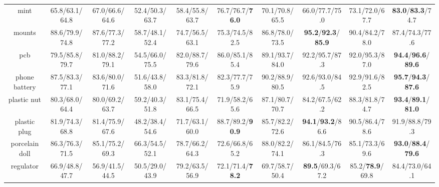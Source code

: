 \documentclass{article}
\theoremstyle{plain}
\theoremstyle{definition}
\theoremstyle{remark}
\begin{document}
\begin{table}[p]
{\begin{tabular}{ccccccccc>{\columncolor{oursblue}}c}
mint             & 65.8/63.1/64.8 & 67.0/66.6/64.6 & 52.4/50.3/63.7 & 58.4/55.8/63.7 & 76.7/76.7/\textbf{76.0} & 70.1/70.8/65.5 & 66.0/77.7/75.0 & 73.1/72.0/67.7 & \textbf{83.0}/\textbf{83.3}/74.7 \\
\cellcolor{rowgray} mounts & \cellcolor{rowgray} 88.6/79.9/74.8 & \cellcolor{rowgray} 87.6/77.3/77.2 & \cellcolor{rowgray} 58.7/48.1/52.4 & \cellcolor{rowgray} 74.7/56.5/63.1 & \cellcolor{rowgray} 75.3/74.5/82.5 & \cellcolor{rowgray} 86.8/78.0/73.5 & \cellcolor{rowgray} \textbf{95.2}/\textbf{92.3}/\textbf{85.9} & \cellcolor{rowgray} 90.4/84.2/78.0 & 87.4/74.3/77.6 \\
pcb              & 79.5/85.8/79.7 & 81.0/88.2/79.1 & 54.5/66.0/75.5 & 82.0/88.7/79.6 & 86.0/85.1/85.4 & 89.1/93.7/84.0 & 92.2/95.7/87.3 & 92.0/95.3/87.0 & \textbf{94.4}/\textbf{96.6}/\textbf{89.6} \\
\cellcolor{rowgray} phone battery & \cellcolor{rowgray} 87.5/83.3/77.1 & \cellcolor{rowgray} 83.6/80.0/71.6 & \cellcolor{rowgray} 51.6/43.8/58.0 & \cellcolor{rowgray} 83.3/81.8/72.1 & \cellcolor{rowgray} 82.3/77.7/75.9 & \cellcolor{rowgray} 90.2/88.9/80.5 & \cellcolor{rowgray} 92.6/93.0/84.5 & \cellcolor{rowgray} 92.9/91.6/82.5 & \textbf{95.7}/\textbf{94.3}/\textbf{87.6} \\
plastic nut      & 80.3/68.0/64.4 & 80.0/69.2/63.7 & 59.2/40.3/51.8 & 83.1/75.4/66.5 & 71.9/58.2/65.6 & 87.1/80.7/70.7 & 84.2/67.5/62.2 & 88.3/81.8/74.7 & \textbf{93.4}/\textbf{89.1}/\textbf{81.0} \\
\cellcolor{rowgray} plastic plug & \cellcolor{rowgray} 81.9/74.3/68.8 & \cellcolor{rowgray} 81.4/75.9/67.6 & \cellcolor{rowgray} 48.2/38.4/54.6 & \cellcolor{rowgray} 71.7/63.1/60.0 & \cellcolor{rowgray} 88.7/89.2/\textbf{90.9} & \cellcolor{rowgray} 85.7/82.2/72.6 & \cellcolor{rowgray} \textbf{94.1}/\textbf{93.2}/86.6 & \cellcolor{rowgray} 90.5/86.4/78.6 & 91.9/88.8/79.3 \\
porcelain doll   & 86.3/76.3/71.5 & 85.1/75.2/69.3 & 66.3/54.5/52.1 & 78.7/66.2/64.3 & 72.6/66.8/65.2 & 88.0/82.2/74.1 & 86.1/84.5/76.3 & 85.1/73.3/69.6 & \textbf{93.0}/\textbf{88.4}/\textbf{79.6} \\
\cellcolor{rowgray} regulator & \cellcolor{rowgray} 66.9/48.8/47.7 & \cellcolor{rowgray} 56.9/41.5/44.5 & \cellcolor{rowgray} 50.5/29.0/43.9 & \cellcolor{rowgray} 79.2/63.5/56.9 & \cellcolor{rowgray} 72.1/71.4/\textbf{78.2} & \cellcolor{rowgray} 69.7/58.7/50.4 & \cellcolor{rowgray} \textbf{89.5}/69.3/67.2 & \cellcolor{rowgray} 85.2/\textbf{78.9}/69.8 & 84.4/73.0/64.1 \\

\end{tabular}}
\end{table}
\end{document}
